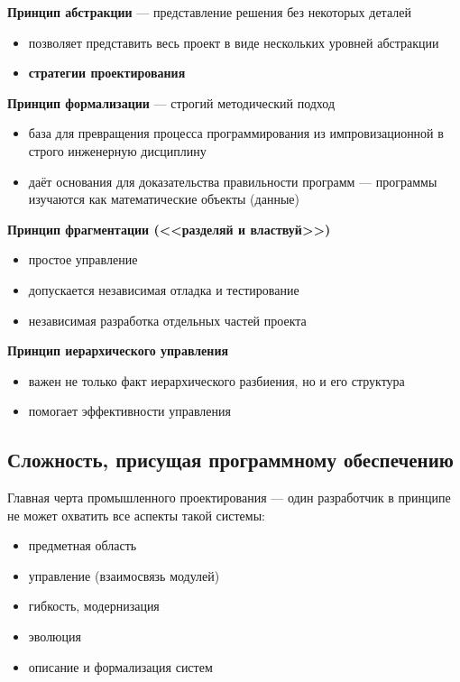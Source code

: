 \textbf{Принцип абстракции} --- представление решения без некоторых деталей
\begin{itemize}
  \item позволяет представить весь проект в виде нескольких уровней абстракции
  \item \textbf{стратегии проектирования}
\end{itemize}

\textbf{Принцип формализации} --- строгий методический подход
\begin{itemize}
  \item база для превращения процесса программирования из импровизационной в строго инженерную дисциплину
  \item даёт основания для доказательства правильности программ --- программы изучаются как математические объекты (данные)
\end{itemize}

\textbf{Принцип фрагментации (<<разделяй и властвуй>>)}
\begin{itemize}
  \item простое управление
  \item допускается независимая отладка и тестирование
  \item независимая разработка отдельных частей проекта
\end{itemize}

\textbf{Принцип иерархического управления}
\begin{itemize}
  \item важен не только факт иерархического разбиения, но и его структура
  \item помогает эффективности управления
\end{itemize}

\subsection{Сложность, присущая программному обеспечению}
Главная черта промышленного проектирования --- один разработчик в принципе не может охватить все аспекты такой системы:
\begin{itemize}
  \item предметная область
  \item управление (взаимосвязь модулей)
  \item гибкость, модернизация
  \item эволюция
  \item описание и формализация систем
\end{itemize}

